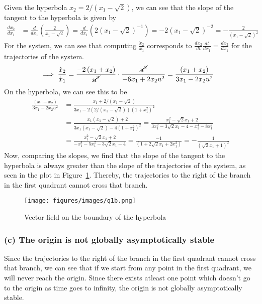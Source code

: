 Given the hyperbola \( x_2 = 2 / (x_1 - \sqrt{2}) \), we can see that the slope of the tangent to the hyperbola is given by
\begin{align*}
    \frac{d x_2}{d x_1}
     & =
    \frac{d}{d x_1} \left( \frac{2}{x_1 - \sqrt{2}} \right)
    =
    \frac{d}{d x_1} \left( 2 (x_1 - \sqrt{2})^{-1} \right)
    =
    -2 (x_1 - \sqrt{2})^{-2}
    =
    -\frac{2}{(x_1 - \sqrt{2})^2}
\end{align*}
For the system, we can see that computing \( \frac{\dot{x}_2}{\dot{x}_1} \) corresponds to \( \frac{dx_2}{dt} \frac{dt}{d x_1} = \frac{dx_2}{d x_1} \) for the trajectories of the system.
\begin{align*}
    \implies
    \frac{\dot{x}_2}{\dot{x}_1}
     & =
    \frac{-2\left(x_{1}+x_{2}\right)}{\cancel{u^{2}}}
    \cdot
    \frac{\cancel{u^{2}}}{-6 x_{1}+2 x_{2} u^2}
    =
    \frac{\left(x_{1}+x_{2}\right)}{3 x_{1} - 2 x_{2} u^2}
\end{align*}
On the hyperbola, we can see this to be
\begin{align*}
    \frac{\left(x_{1}+x_{2}\right)}{3 x_{1} - 2 x_{2} u^2}
     & =
    \frac{x_1 + 2 / (x_1 - \sqrt{2})}{3 x_1 - 2 \left( 2 / (x_1 - \sqrt{2}) \right) (1+x_1^2)^2}
    \\ & =
    \frac{x_1 (x_1 - \sqrt{2}) + 2}{3 x_1 (x_1 - \sqrt{2}) - 4 (1+x_1^2)^2}
    =
    \frac{x_1^2 - \sqrt{2} x_1 + 2}{3 x_1^2 - 3 \sqrt{2} x_1 - 4 - x_1^4 - 8 x_1^2}
    \\ & =
    \frac{x_1^2 - \sqrt{2} x_1 + 2}{-x_1^4 - 5 x_1^2 - 3 \sqrt{2} x_1 - 4}
    =
    \frac{-1}{\left(1+2 \sqrt{2} x_{1}+2 x_{1}^{2}\right)}
    =
    -\frac{1}{(\sqrt{2} x_{1}+ 1)^2}
\end{align*}
Now, comparing the slopes, we find that the slope of the tangent to the hyperbola is always greater than the slope of the trajectories of the system, as seen in the plot in Figure~\ref{fig:q1b}.
Thereby, the trajectories to the right of the branch in the first quadrant cannot cross that branch.

\begin{figure}[htb]
    \centering
    \texttt{[image: figures/images/q1b.png]}
    \caption{
        Vector field on the boundary of the hyperbola
    }\label{fig:q1b}
\end{figure}

\newpage
\subsubsection*{(c) The origin is not globally asymptotically stable}

Since the trajectories to the right of the branch in the first quadrant cannot cross that branch, we can see that if we start from any point in the first quadrant, we will never reach the origin.
Since there exists atleast one point which doesn't go to the origin as time goes to infinity, the origin is not globally asymptotically stable.
